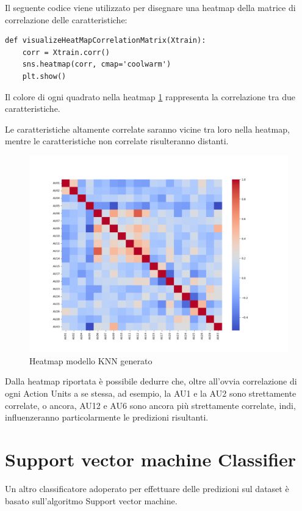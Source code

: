 Il seguente codice viene utilizzato per disegnare una heatmap della matrice di correlazione delle caratteristiche:
\begin{verbatim}
def visualizeHeatMapCorrelationMatrix(Xtrain):
    corr = Xtrain.corr()
    sns.heatmap(corr, cmap='coolwarm')
    plt.show()
\end{verbatim}

Il colore di ogni quadrato nella heatmap \ref{fig:image15} rappresenta la correlazione tra due caratteristiche. 

Le caratteristiche altamente correlate saranno vicine tra loro nella heatmap, mentre le caratteristiche non correlate risulteranno distanti. 

\begin{figure}
    \begin{center}    
        \includegraphics[width=0.9\linewidth]{images/image39.png}
        \caption{Heatmap modello KNN generato}
        \label{fig:image15}
    \end{center}
\end{figure}

Dalla heatmap riportata è possibile dedurre che, oltre all’ovvia correlazione di ogni Action Units a se stessa, ad esempio, la AU1 e la AU2 sono strettamente correlate, o ancora, AU12 e AU6 sono ancora più strettamente correlate, indi, influenzeranno particolarmente le predizioni risultanti.


\section{Support vector machine Classifier}
Un altro classificatore adoperato per effettuare delle predizioni sul dataset è basato sull’algoritmo Support vector machine.

